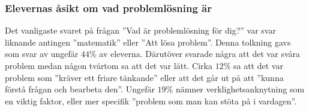 \subsubsection{Elevernas åsikt om vad problemlösning är}
    \textcolor{lila}{Det vanligaste svaret på frågan ''Vad är problemlösning för dig?'' var svar liknande antingen ''matematik'' eller ''Att lösa problem''. Denna tolkning gavs som svar av ungefär $44\%$ av eleverna. Därutöver svarade några att det var svåra problem medan någon tvärtom sa att det var lätt. Cirka $12\%$ sa att det var problem som ''kräver ett friare tänkande'' eller att det går ut på att ''kunna förstå frågan och bearbeta den''. Ungefär $19\%$ nämner verklighetsanknytning som en viktig faktor, eller mer specifik ''problem som man kan stöta på i vardagen''.}


